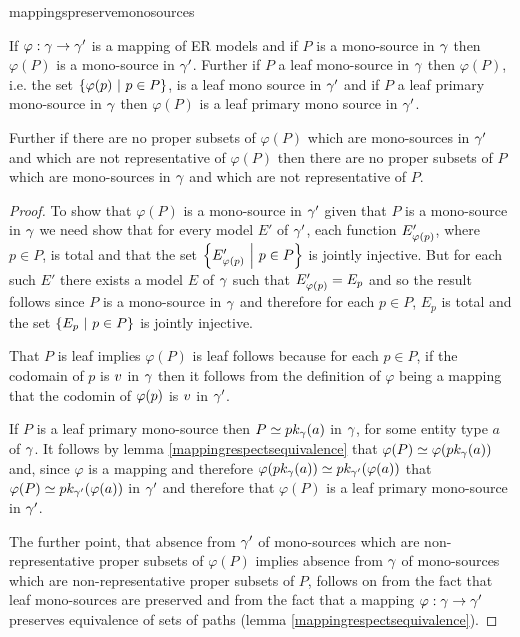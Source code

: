 mappingspreservemonosources
\begin{lemma}
\label{mappingspreservemonosources}
If $\varphi: \gmodel \morph \gmodel'$ is a mapping of ER models and
if $P$ is a mono-source in $\gmodel$ then  
$\varphi(P)$ is a mono-source in $\gmodel'$. 
Further if $P$ a leaf mono-source in $\gmodel$ then $\varphi(P)$, i.e. the set $\setsuchthat{\phip}{p\in P}$, is a leaf mono source in $\gmodel'$ and if $P$ a leaf primary mono-source in $\gmodel$ then $\varphi(P)$ is a leaf primary mono source in $\gmodel'$.

Further if there are no proper subsets of $\varphi(P)$ which are mono-sources in $\gmodel'$ and which are not representative of $\varphi(P)$ then there are no proper subsets of $P$ which are mono-sources in $\gmodel$ and which are not representative of $P$.

\end{lemma}
\begin{proof}
To show that $\varphi(P)$ is a mono-source in $\gmodel'$ given that $P$ is a mono-source in $\gmodel$ we need show that for every model $E'$ of $\gmodel'$, 
each function $E'_{\phip}$,  where $p \in P$, is total and that the set
$\setsuchthat{E'_{\phip}}{p \in P}$ is jointly injective. But for each such $E'$ there exists a model $E$ of $\gmodel$ such that $E'_{\phip}=E_{p}$  and so the result follows  since $P$ is a mono-source in $\gmodel$ and therefore for each $p \in P$, $E_p$ is total and the set $\setsuchthat{E_p}{p\in P}$ is jointly injective.

That $P$ is leaf implies $\varphi(P)$ is leaf follows because for each $p \in P$, if the codomain of $p$ is 
$\veee$ in $\gmodel$ then it follows from the definition of $\varphi$ being a mapping that the codomin of $\phip$ is  $\veee$ in $\gmodel'$. 

If $P$ is a leaf primary mono-source then $P \simeq \pk{a}$ in $\gmodel$, for some entity type $a$ of $\gmodel$.
It follows by lemma \ref{mappingrespectsequivalence} that $\varphi(P) \simeq \varphi(\pk{a})$
and,  since $\varphi$ is a mapping and therefore $\varphi(\pk{a})\simeq \pk[\gmodel']{\varphi(a)}$ 
that $\varphi(P) \simeq  \pk[\gmodel']{\varphi(a)}$ in $\gmodel'$ and therefore that  $\varphi(P)$ is a leaf primary mono-source in $\gmodel'$.

The further point, that absence from $\gmodel'$ of mono-sources which are non-representative proper subsets of $\varphi(P)$
 implies absence from $\gmodel$ of mono-sources which are non-representative proper subsets of $P$, follows on from the fact that leaf mono-sources are preserved 
and from the fact that a mapping $\varphi:\gmodel \morph \gmodel'$ preserves equivalence of sets of paths
(lemma \ref{mappingrespectsequivalence}).

\end{proof}


